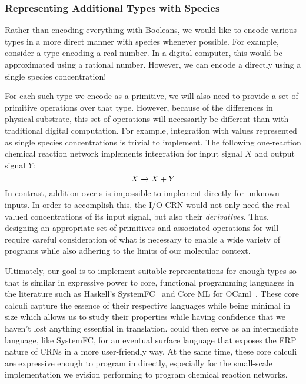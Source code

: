 \subsubsection{Representing Additional Types with Species}
Rather than encoding everything with Booleans, we would like to encode various types in a more direct manner with species whenever possible.
For example, consider a  type encoding a real number.
In a digital computer, this would be approximated using a rational number.
However, we can encode a  directly using a single species concentration!

For each such type we encode as a primitive, we will also need to provide a set of primitive operations over that type.
However, because of the differences in physical substrate, this set of operations will necessarily be different than with traditional digital computation.
For example, integration with  values represented as single species concentrations is trivial to implement.
The following one-reaction chemical reaction network implements integration for input signal \( X \) and output signal \( Y \):
\[
  X \xrightarrow{} X + Y
\]
In contrast, addition over s is impossible to implement directly for unknown inputs.
In order to accomplish this, the I/O CRN would not only need the real-valued concentrations of its input signal, but also their \emph{derivatives}.
Thus, designing an appropriate set of primitives and associated operations for \reactamole{} will require careful consideration of what is necessary to enable a wide variety of programs while also adhering to the limits of our molecular context.

Ultimately, our goal is to implement suitable representations for enough types so that \reactamole is similar in expressive power to core, functional programming languages in the literature such as Haskell's SystemFC~\cite{weirich:2013:fc} and Core ML for OCaml~\cite{remy:2001:ocaml}.
These core calculi capture the essence of their respective languages while being minimal in size which allows us to study their properties while having confidence that we haven't lost anything essential in translation.
\reactamole could then serve as an intermediate language, like SystemFC, for an eventual surface language that exposes the FRP nature of CRNs in a more user-friendly way.
At the same time, these core calculi are expressive enough to program in directly, especially for the small-scale implementation we evision performing to program chemical reaction networks.

